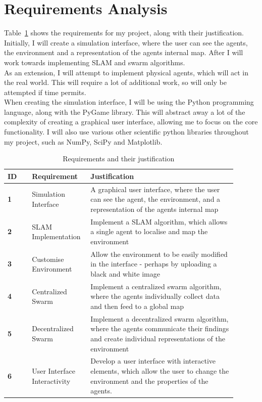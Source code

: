 \documentclass[12pt]{article}
\begin{document}
\section{Requirements Analysis}
Table~\ref{tab:requirements_table} shows the requirements for my project, along with their justification. Initially, I will
create a simulation interface, where the user can see the agents, the environment and a representation of the agents internal
map. After I will work towards implementing SLAM and swarm algorithms.\\
As an extension, I will attempt to implement physical agents, which will act in the real world. This will require a lot of
additional work, so will only be attempted if time permits.\\
When creating the simulation interface, I will be using the Python programming language, along with the PyGame library. This
will abstract away a lot of the complexity of creating a graphical user interface, allowing me to focus on the core functionality.
I will also use various other scientific python libraries throughout my project, such as NumPy, SciPy and Matplotlib.\\

\begin{table}[H]
    \centering
    \begin{tabular}{|p{0.1\linewidth}|p{0.2\linewidth}|p{0.6\linewidth}|}
        \hline
        \textbf{ID} &
        \textbf{Requirement} &
        \textbf{Justification}\\
        \hline
        \textbf{1} &
        Simulation Interface &
        A graphical user interface, where the user can see the agent, the environment, and a representation of
            the agents internal map\\
        \hline
        \textbf{2} &
        SLAM Implementation &
        Implement a SLAM algorithm, which allows a single agent to localise and map the environment\\
        \hline
        \textbf{3} &
        Customise Environment &
        Allow the environment to be easily modified in the interface - perhaps by uploading a black and white image\\
        \hline
        \textbf{4} &
        Centralized Swarm &
        Implement a centralized swarm algorithm, where the agents individually collect data and then feed to a global map\\
        \hline
        \textbf{5} &
        Decentralized Swarm &
        Implement a decentralized swarm algorithm, where the agents communicate their findings and create individual representations
            of the environment\\
        \hline
        \textbf{6} &
        User Interface Interactivity &
        Develop a user interface with interactive elements, which allow the user to change the environment and the properties of the agents.\\
        \hline
    \end{tabular}
    \caption{Requirements and their justification}\label{tab:requirements_table}
\end{table}
\end{document}
